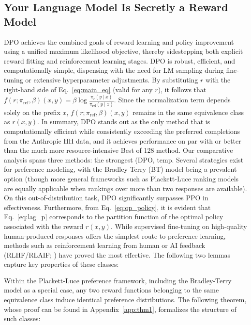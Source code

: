\begin{lemma}
\begin{sproof}
\subsection{Your Language Model Is Secretly a Reward Model} DPO achieves the combined goals of reward learning and policy improvement using a unified maximum likelihood objective, thereby sidestepping both explicit reward fitting and reinforcement learning stages. DPO is robust, efficient, and computationally simple, dispensing with the need for LM sampling during fine-tuning or extensive hyperparameter adjustments. By substituting $r$ with the right-hand side of Eq.~\ref{eq:main_eq} (valid for any $r$), it follows that $f(r; \pi_\text{ref}, \beta)(x, y) = \beta \log \frac{\pi_r(y\mid x)}{\pi_\text{ref}(y\mid x)}$. Since the normalization term depends solely on the prefix $x$, $f(r; \pi_\text{ref}, \beta)(x, y)$ remains in the same equivalence class as $r(x, y)$. In summary, DPO stands out as the only method that is computationally efficient while consistently exceeding the preferred completions from the Anthropic HH data, and it achieves performance on par with or better than the much more resource-intensive Best of 128 method. Our comparative analysis spans three methods: the strongest (DPO, temp. Several strategies exist for preference modeling, with the Bradley-Terry (BT) model \cite{bradley1952rankanalysis} being a prevalent option (though more general frameworks such as Plackett-Luce ranking models \citep{plackett1975analysis, luce2012individual} are equally applicable when rankings over more than two responses are available). On this out-of-distribution task, DPO significantly surpasses PPO in effectiveness. Furthermore, from Eq.~\ref{eq:op_policy}, it is evident that Eq.~\ref{eq:lag_p} corresponds to the partition function of the optimal policy associated with the reward $r(x, y)$. While supervised fine-tuning on high-quality human-produced responses offers the simplest route to preference learning, methods such as reinforcement learning from human or AI feedback (RLHF/RLAIF; \citep{christiano2017deep,bai2022constitutional}) have proved the most effective. The following two lemmas capture key properties of these classes:

\begin{lemma}\label{lemma:same_prefrence} 
Within the Plackett-Luce preference framework, including the Bradley-Terry model as a special case, any two reward functions belonging to the same equivalence class induce identical preference distributions. The following theorem, whose proof can be found in Appendix~\ref{app:thm1}, formalizes the structure of such classes:


\end{lemma}
\end{sproof}
\end{lemma}
